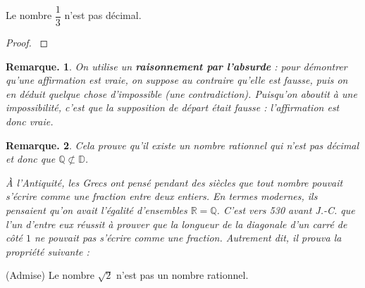 \documentclass[12pt]{article}
\theoremstyle{break}
\newtheorem*{remark}{Remarque.}
\begin{document}
\begin{proposition}{}{}
  Le nombre $\dfrac{1}{3}$ n'est pas décimal.
\end{proposition}

\begin{proof}$ $\newline
\vspace{0.2em}
\noindent{}
\end{proof}

\begin{remark}
  On utilise un \textbf{raisonnement par l'absurde} : pour démontrer qu'une affirmation est vraie, on suppose au contraire qu'elle est fausse, puis on en déduit quelque chose d'impossible (une \emph{contradiction}). Puisqu'on aboutit à une impossibilité, c'est que la supposition de départ était fausse : l'affirmation est donc vraie.
\end{remark}

\begin{remark}
  Cela prouve qu'il existe un nombre rationnel qui n'est pas décimal et donc que $\mathbb{Q} \not\subset \mathbb{D}$.

  À l'Antiquité, les Grecs ont pensé pendant des siècles que tout nombre pouvait s'écrire comme une fraction entre deux entiers. En termes modernes, ils pensaient qu'on avait l'égalité d'ensembles $\mathbb{R} = \mathbb{Q}$. C'est vers 530 avant J.-C. que l'un d'entre eux réussit à prouver que la longueur de la diagonale d'un carré de côté $1$ ne pouvait pas s'écrire comme une fraction. Autrement dit, il prouva la propriété suivante :
\end{remark}

\begin{proposition}{(Admise)}{}
  Le nombre $\sqrt{2}$ n'est pas un nombre rationnel.
\end{proposition}
\end{document}
